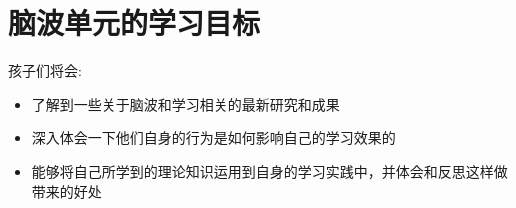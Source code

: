\chapter{脑波单元的学习目标}
    孩子们将会:
    \begin{itemize}
      \item  了解到一些关于脑波和学习相关的最新研究和成果
      \item  深入体会一下他们自身的行为是如何影响自己的学习效果的
      \item  能够将自己所学到的理论知识运用到自身的学习实践中，并体会和反思这样做带来的好处
    \end{itemize}  
